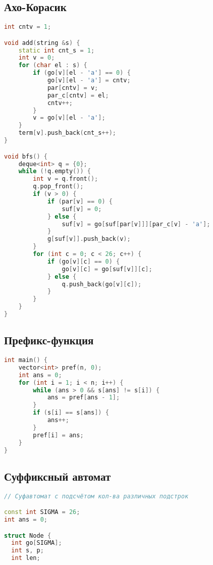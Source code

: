 \documentclass[10pt,a4paper,landscape,twosided]{extarticle}
\begin{document}
\begin{multicols*}{3}
\begin{lstlisting}[language=C++]
\end{lstlisting}

\subsection{Ахо-Корасик}
\begin{lstlisting}[language=C++]
int cntv = 1;

void add(string &s) {
    static int cnt_s = 1;
    int v = 0;
    for (char el : s) {
        if (go[v][el - 'a'] == 0) {
            go[v][el - 'a'] = cntv;
            par[cntv] = v;
            par_c[cntv] = el;
            cntv++;
        }
        v = go[v][el - 'a'];
    }
    term[v].push_back(cnt_s++);
}

void bfs() {
    deque<int> q = {0};
    while (!q.empty()) {
        int v = q.front();
        q.pop_front();
        if (v > 0) {
            if (par[v] == 0) {
                suf[v] = 0;
            } else {
                suf[v] = go[suf[par[v]]][par_c[v] - 'a'];
            }
            g[suf[v]].push_back(v);
        }
        for (int c = 0; c < 26; c++) {
            if (go[v][c] == 0) {
                go[v][c] = go[suf[v]][c];
            } else {
                q.push_back(go[v][c]);
            }
        }
    }
}

\end{lstlisting}

\subsection{Префикс-функция}
\begin{lstlisting}[language=C++]
int main() {
    vector<int> pref(n, 0);
    int ans = 0;
    for (int i = 1; i < n; i++) {
        while (ans > 0 && s[ans] != s[i]) {
            ans = pref[ans - 1];
        }
        if (s[i] == s[ans]) {
            ans++;
        }
        pref[i] = ans;
    }
}

\end{lstlisting}

\subsection{Суффиксный автомат}
\begin{lstlisting}[language=C++]
// Суфавтомат с подсчётом кол-ва различных подстрок

const int SIGMA = 26;
int ans = 0;

struct Node {
  int go[SIGMA];
  int s, p;
  int len;


\end{lstlisting}
\end{multicols*}
\end{document}
